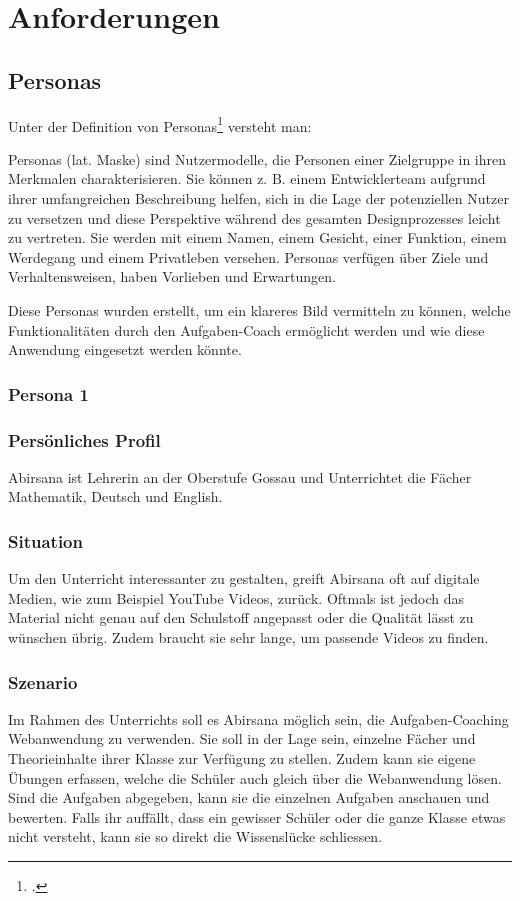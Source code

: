 \section{Anforderungen}

\subsection{Personas}
Unter der Definition von Personas\footcite{persona_definition} versteht man: 
\begin{displayquote}
Personas (lat. Maske) sind Nutzermodelle, die Personen einer Zielgruppe in ihren Merkmalen charakterisieren. Sie können z. B. einem Entwicklerteam aufgrund ihrer umfangreichen Beschreibung helfen, sich in die Lage der potenziellen Nutzer zu versetzen und diese Perspektive während des gesamten Designprozesses leicht zu vertreten. Sie werden mit einem Namen, einem Gesicht, einer Funktion, einem Werdegang und einem Privatleben versehen. Personas verfügen über Ziele und Verhaltensweisen, haben Vorlieben und Erwartungen.
\end{displayquote}

Diese Personas wurden erstellt, um ein klareres Bild vermitteln zu können, welche Funktionalitäten durch den Aufgaben-Coach ermöglicht werden und wie diese Anwendung eingesetzt werden könnte.

\subsubsection{Persona 1}
\subsubsection*{Persönliches Profil}
Abirsana ist Lehrerin an der Oberstufe Gossau und Unterrichtet die Fächer Mathematik, Deutsch und English.

\subsubsection*{Situation}
Um den Unterricht interessanter zu gestalten, greift Abirsana oft auf digitale Medien, wie zum Beispiel YouTube Videos, zurück. Oftmals ist jedoch das Material nicht genau auf den Schulstoff angepasst oder die Qualität lässt zu wünschen übrig. Zudem braucht sie sehr lange, um passende Videos zu finden.

\subsubsection*{Szenario}
Im Rahmen des Unterrichts soll es Abirsana möglich sein, die Aufgaben-Coaching Webanwendung zu verwenden. Sie soll in der Lage sein, einzelne Fächer und Theorieinhalte ihrer Klasse zur Verfügung zu stellen. Zudem kann sie eigene Übungen erfassen, welche die Schüler auch gleich über die Webanwendung lösen. Sind die Aufgaben abgegeben, kann sie die einzelnen Aufgaben anschauen und bewerten. Falls ihr auffällt, dass ein gewisser Schüler oder die ganze Klasse etwas nicht versteht, kann sie so direkt die Wissenslücke schliessen.

